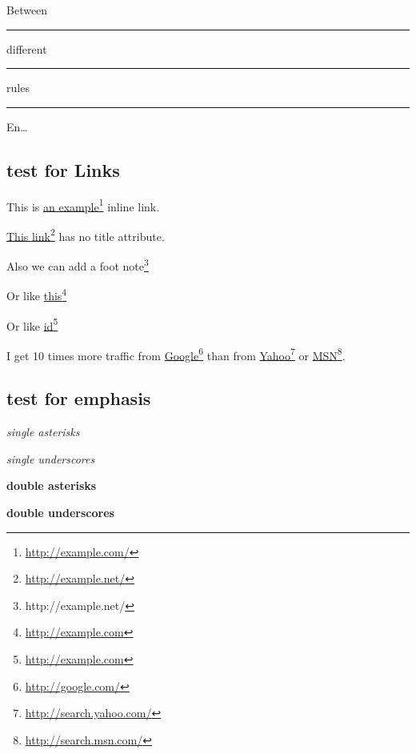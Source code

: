 Between

\begin{center}\rule{3in}{0.4pt}\end{center}


different 

\begin{center}\rule{3in}{0.4pt}\end{center}


rules

\begin{center}\rule{3in}{0.4pt}\end{center}


En{\ldots}

\subsection{test for Links}
\label{testforlinks}

This is \href{http://example.com/}{an example}\footnote{\href{http://example.com/}{http:/\slash example.com\slash }} inline link.

\href{http://example.net/}{This link}\footnote{\href{http://example.net/}{http:/\slash example.net\slash }} has no title attribute.

Also we can add a foot note\footnote{http:\slash \slash example.net\slash }

Or like \href{http://example.com}{this}\footnote{\href{http://example.com}{http:/\slash example.com}}

Or like \href{http://example.com}{id}\footnote{\href{http://example.com}{http:/\slash example.com}}

I get 10 times more traffic from \href{http://google.com/}{Google}\footnote{\href{http://google.com/}{http:/\slash google.com\slash }} than from
\href{http://search.yahoo.com/}{Yahoo}\footnote{\href{http://search.yahoo.com/}{http:/\slash search.yahoo.com\slash }} or \href{http://search.msn.com/}{MSN}\footnote{\href{http://search.msn.com/}{http:/\slash search.msn.com\slash }}.

\subsection{test for emphasis}
\label{testforemphasis}

\emph{single asterisks}

\emph{single underscores}

\textbf{double asterisks}

\textbf{double underscores}

